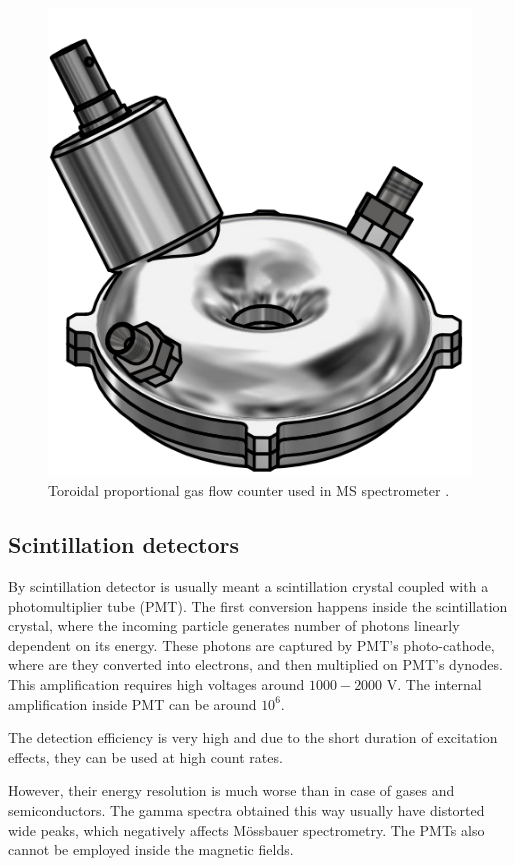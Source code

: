 \begin{figure}[H]
 \centering
 \includegraphics[scale=0.55, angle = 0]{./pictures/GASdet.png}
 \caption{Toroidal proportional gas flow counter used in MS spectrometer \cite{Optimized}.}
 \label{toroid}
 
\end{figure}


\subsection{Scintillation detectors}
By scintillation detector is usually meant a scintillation crystal coupled with a photomultiplier tube (PMT). The first conversion happens inside the scintillation crystal, where the incoming particle generates number of photons linearly dependent on its energy. These photons are captured by PMT's photo-cathode, where are they converted into electrons, and then multiplied on PMT's dynodes. This amplification requires high voltages around $1000 - 2000$ V. The internal amplification inside PMT can be around $10^6$.
\par
The detection efficiency is very high and due to the short duration of excitation effects, they can be used at high count rates.
\par
However, their energy resolution is much worse than in case of gases and semiconductors. The gamma spectra obtained this way usually have distorted wide peaks, which negatively affects Mössbauer spectrometry. The PMTs also cannot be employed inside the magnetic fields. 


